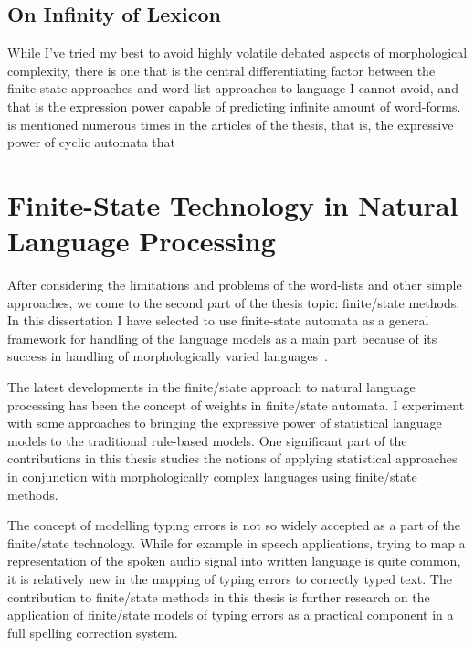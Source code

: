 \documentclass[officiallayout]{unihelcompling}
\begin{document}
\subsection{On Infinity of Lexicon}
\label{subsec:infinity}

While I've tried my best to avoid highly volatile debated aspects of
morphological complexity, there is one that is the central differentiating
factor between the finite-state approaches and word-list approaches to
language I cannot avoid, and that is the expression power capable of
predicting infinite amount of word-forms.  is mentioned numerous times in the
articles of the thesis, that is, the expressive power of cyclic automata that

\section{Finite-State Technology in Natural Language Processing}
\label{sec:finite-state-technology-in-nlp}

After considering the limitations and problems of the word-lists and other
simple approaches, we come to the second part of the thesis topic: finite\-/state
methods. In this dissertation I have selected to use finite-state automata
as a general framework for handling of the language models as a main part
because of its success in handling of morphologically varied 
languages~\cite{beesley2003finite}.

The latest developments in the finite\-/state approach to natural language
processing has been the concept of weights in finite\-/state automata.  I
experiment with some approaches to bringing the expressive power of
statistical language models to the traditional rule-based models. One
significant part of the contributions in this thesis studies the notions of
applying statistical approaches in conjunction with morphologically complex
languages using finite\-/state methods.

The concept of modelling typing errors is not so widely accepted as a part of
the finite\-/state technology. While for example in speech applications,
trying to map a representation of the spoken audio signal into written language
is quite common, it is relatively new in the mapping of typing errors to
correctly typed text. The contribution to finite\-/state methods in this thesis
is further research on the application of finite\-/state models of typing errors
as a practical component in a full spelling correction system.

\end{document}
